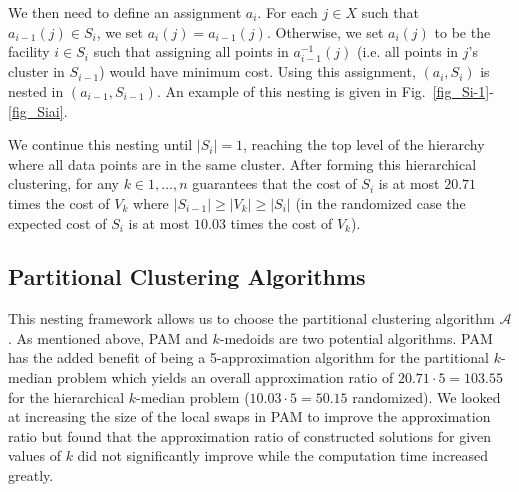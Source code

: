 \documentclass[conference, 10pt, final]{IEEEtran}
\begin{document}
We then need to define an assignment $a_i$. For each $j \in X$ such that $a_{i-1}(j) \in S_{i}$, we set $a_i(j) = a_{i-1}(j)$. Otherwise, we set $a_i(j)$ to be the facility $i \in S_i$ such that assigning all points in $a_{i-1}^{-1}(j)$ (i.e. all points in $j$'s cluster in $S_{i-1}$) would have minimum cost. Using this assignment, $(a_i, S_i)$ is nested in $(a_{i-1}, S_{i-1})$. An example of this nesting is given in Fig.~\ref{fig_Si-1}-\ref{fig_Siai}.

We continue this nesting until $|S_i| = 1$, reaching the top level of the hierarchy where all data points are in the same cluster. After forming this hierarchical clustering, for any $k \in 1, \ldots, n$ \cite{Lin} guarantees that the cost of $S_i$ is at most $20.71$ times the cost of $V_k$ where $|S_{i-1}| \geq |V_k| \geq |S_{i}|$ (in the randomized case the expected cost of $S_i$ is at most $10.03$ times the cost of $V_k$).


\subsection{Partitional Clustering Algorithms}
This nesting framework allows us to choose the partitional clustering algorithm $\mathcal{A}$. As mentioned above, PAM and $k$-medoids are two potential algorithms. PAM has the added benefit of being a 5-approximation algorithm for the partitional $k$-median problem which yields an overall approximation ratio of $20.71 \cdot 5 = 103.55$ for the hierarchical $k$-median problem ($10.03 \cdot 5 = 50.15$ randomized). We looked at increasing the size of the local swaps in PAM to improve the approximation ratio but found that the approximation ratio of constructed solutions for given values of $k$ did not significantly improve while the computation time increased greatly. 
\end{document}
